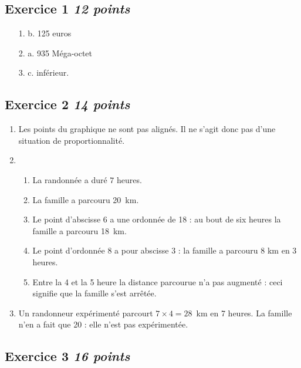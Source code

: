 \documentclass[10pt]{article}
\begin{document}
\setlength{\columnseprule}{1pt}


\subsection*{Exercice 1 \hfill \textit{12 points}}

\begin{enumerate}
    \item[1.] b. 125 euros
    \item[2.] a. 935 Méga-octet
    \item[3.] c. inférieur.
\end{enumerate}    
\subsection*{Exercice 2 \hfill \textit{14 points}}


\begin{enumerate}
    \item Les points du graphique ne sont pas alignés. Il ne s'agit donc pas d'une situation de proportionnalité.
    \item 
        \begin{enumerate}
            \item La randonnée a duré  $7$ heures.
            \item La famille a parcouru 20~km.
            \item Le point d'abscisse 6 a une ordonnée de 18 : au bout de six heures la famille a parcouru 18~km.
            \item Le point d'ordonnée 8 a pour abscisse 3 : la famille a parcouru 8 km en 3 heures.
            \item Entre la 4 et la 5 heure la distance parcourue n'a pas augmenté : ceci signifie que la famille s'est arrêtée.		
        \end{enumerate}
    \item Un randonneur expérimenté parcourt $7 \times 4 = 28$~km en 7 heures. La famille n'en a fait que 20 : elle n'est pas expérimentée.
    \end{enumerate}
    

\subsection*{Exercice 3 \hfill \textit{16 points}}
\end{document}
